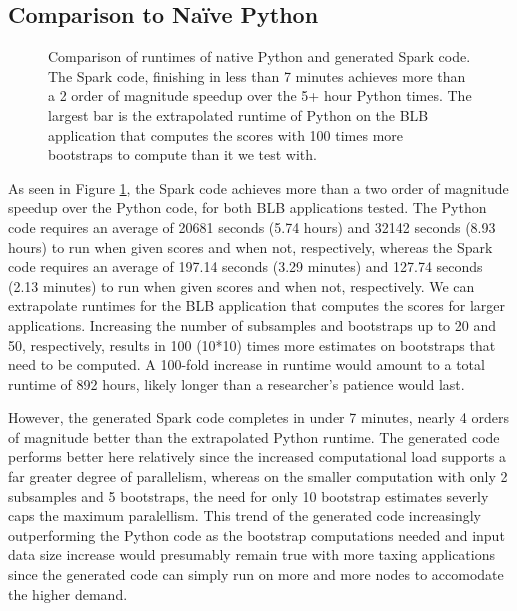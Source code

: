 \subsection{Comparison to Na\"ive Python}
\begin{figure}
\centering
{}
\caption{Comparison of runtimes of native Python and generated Spark code. The Spark code, finishing in less than 7 minutes achieves more than a 2 order of magnitude speedup over the 5+ hour Python times. The largest bar is the extrapolated runtime of Python on the BLB application that computes the scores with 100 times more bootstraps to compute than it we test with.}
\label{fig:python}
\end{figure}
 
 As seen in Figure \ref{fig:python}, the Spark code achieves more than a two order of magnitude speedup over the Python code, for both BLB applications tested. The Python code requires an average of 20681 seconds (5.74 hours) and 32142 seconds (8.93 hours) to run when given scores and when not, respectively, whereas the Spark code requires an average of 197.14 seconds (3.29 minutes) and 127.74 seconds (2.13 minutes) to run when given scores and when not, respectively. 
 We can extrapolate runtimes for the BLB application that computes the scores for larger applications. Increasing the number of subsamples and bootstraps up to 20 and 50, respectively, results in 100 (10*10) times more estimates on bootstraps that need to be computed. A 100-fold increase in runtime would amount to a total runtime of 892 hours, likely longer than a researcher's patience would last. 

However, the generated Spark code completes in under 7 minutes, nearly 4 orders of magnitude better than the extrapolated Python runtime. The generated code performs better here relatively since the increased computational load supports a far greater degree of parallelism, whereas on the smaller computation with only 2 subsamples and 5 bootstraps, the need for only 10 bootstrap estimates severly caps the maximum paralellism. This trend of the generated code increasingly outperforming the Python code as the bootstrap computations needed and input data size increase would presumably remain true with more taxing applications since the generated code can simply run on more and more nodes to accomodate the higher demand. 



